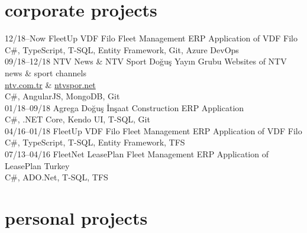 \documentclass[]{friggeri-cv} %
\begin{document}
\section{corporate projects}

\begin{entrylist}

\entry
{12/18--Now}
{FleetUp}
{VDF Filo}
{Fleet Management ERP Application of VDF Filo
\\C\#, TypeScript, T-SQL, Entity Framework, Git, Azure DevOps}
\\
\entry
{09/18--12/18}
{NTV News \& NTV Sport}
{Doğuş Yayın Grubu}
{Websites of NTV news \& sport channels
\\\href{https://www.ntv.com.tr/}{ntv.com.tr} \& \href{http://www.ntvspor.net/}{ntvspor.net}
\\C\#, AngularJS, MongoDB, Git}
\\
\entry
{01/18--09/18}
{Agrega}
{Doğuş İnşaat}
{Construction ERP Application
\\C\#, .NET Core, Kendo UI, T-SQL, Git}
\\
\entry
{04/16--01/18}
{FleetUp}
{VDF Filo}
{Fleet Management ERP Application of VDF Filo
\\C\#, TypeScript, T-SQL, Entity Framework, TFS}
\\
\entry
{07/13--04/16}
{FleetNet}
{LeasePlan}
{Fleet Management ERP Application of LeasePlan Turkey
\\C\#, ADO.Net, T-SQL, TFS}

\end{entrylist}

\section{personal projects}
\end{document}
